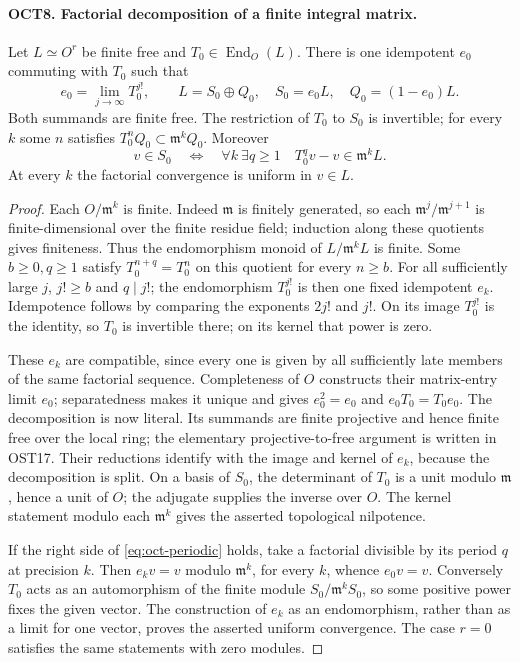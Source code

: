 \documentclass[11pt,a4paper]{article}
\numberwithin{equation}{section}
\theoremstyle{remark}\newtheorem{remark}[theorem]{Remark}
\begin{document}
\paragraph{OCT8. Factorial decomposition of a finite integral matrix.}
\label{claim:OCT8}
Let $L\simeq O^r$ be finite free and $T_0\in\operatorname{End}_O(L)$.
There is one idempotent $e_0$ commuting with $T_0$ such that
\[
 e_0=\lim_{j\to\infty}T_0^{j!},\qquad
 L=S_0\oplus Q_0,\quad S_0=e_0L,
                         \quad Q_0=(1-e_0)L.
\]
Both summands are finite free.  The restriction of $T_0$ to
$S_0$ is invertible; for every $k$ some $n$ satisfies
$T_0^nQ_0\subset\mathfrak m^k Q_0$.  Moreover
\begin{equation}\label{eq:oct-periodic}
 v\in S_0\quad\Longleftrightarrow\quad
 \forall k\ \exists q\geq1\quad T_0^qv-v\in\mathfrak m^kL.
\end{equation}
At every $k$ the factorial convergence is uniform in $v\in L$.
\begin{proof}
Each $O/\mathfrak m^k$ is finite.  Indeed
$\mathfrak m$ is finitely generated, so each
$\mathfrak m^j/\mathfrak m^{j+1}$ is finite-dimensional over
the finite residue field; induction along these quotients
gives finiteness.  Thus the endomorphism monoid of
$L/\mathfrak m^kL$ is finite.  Some $b\geq0,\allowbreak{} q\geq1$ satisfy
$T_0^{n+q}=T_0^n$ on this quotient for every $n\geq b$.
For all sufficiently large $j$, $j!\geq b$ and $q\mid j!$;
the endomorphism $T_0^{j!}$ is then one fixed idempotent $e_k$.
Idempotence follows by comparing the exponents $2j!$ and $j!$.
On its image $T_0^{j!}$ is the identity, so $T_0$ is invertible
there; on its kernel that power is zero.

These $e_k$ are compatible, since every one is given by all
sufficiently late members of the same factorial sequence.
Completeness of $O$ constructs their matrix-entry limit $e_0$;
separatedness makes it unique and gives $e_0^2=e_0$ and
$e_0T_0=T_0e_0$.  The decomposition is now literal.  Its
summands are finite projective and hence finite free over the
local ring; the elementary projective-to-free argument is
written in OST17.  Their reductions identify with the image
and kernel of $e_k$, because the decomposition is split.
On a basis of $S_0$, the determinant of $T_0$ is a unit modulo
$\mathfrak m$, hence a unit of $O$; the adjugate supplies the
inverse over $O$.  The kernel statement modulo each
$\mathfrak m^k$ gives the asserted topological nilpotence.

If the right side of \eqref{eq:oct-periodic} holds, take a
factorial divisible by its period $q$ at precision $k$.
Then $e_kv=v$ modulo $\mathfrak m^k$, for every $k$, whence
$e_0v=v$.  Conversely $T_0$ acts as an automorphism of the
finite module $S_0/\mathfrak m^kS_0$, so some positive power
fixes the given vector.  The construction of $e_k$ as an
endomorphism, rather than as a limit for one vector, proves
the asserted uniform convergence.  The case $r=0$ satisfies
the same statements with zero modules.
\end{proof}
\end{document}
